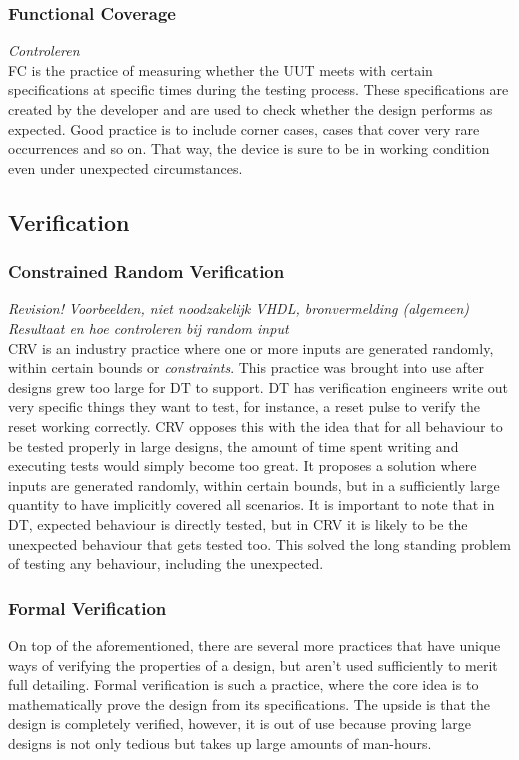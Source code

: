 \documentclass[11pt,british]{article}
\begin{document}
\subsubsection{Functional Coverage}
\emph{\color{red}Controleren}\\
\gls{FC} is the practice of measuring whether the \gls{UUT} meets with certain specifications at specific times during the testing process. These specifications are created by the developer and are used to check whether the design performs as expected. Good practice is to include corner cases, cases that cover very rare occurrences and so on. That way, the device is sure to be in working condition even under unexpected circumstances.

\subsection{Verification}
\subsubsection{Constrained Random Verification}
\emph{\color{red}Revision!}
\emph{\color{red}Voorbeelden, niet noodzakelijk VHDL, bronvermelding (algemeen)}\\
\emph{\color{red}Resultaat en hoe controleren bij random input}\\
\gls{CRV} is an industry practice where one or more inputs are generated randomly, within certain bounds or \emph{constraints}. This practice was brought into use after designs grew too large for \gls{DT} to support. DT has verification engineers write out very specific things they want to test, for instance, a reset pulse to verify the reset working correctly. CRV opposes this with the idea that for all behaviour to be tested properly in large designs, the amount of time spent writing and executing tests would simply become too great. It proposes a solution where inputs are generated randomly, within certain bounds, but in a sufficiently large quantity to have implicitly covered all scenarios. It is important to note that in DT, expected behaviour is directly tested, but in CRV it is likely to be the unexpected behaviour that gets tested too. This solved the long standing problem of testing any behaviour, including the unexpected.

\subsubsection{Formal Verification}
On top of the aforementioned, there are several more practices that have unique ways of verifying the properties of a design, but aren't used sufficiently to merit full detailing. Formal verification is such a practice, where the core idea is to mathematically prove the design from its specifications. The upside is that the design is completely verified, however, it is out of use because proving large designs is not only tedious but takes up large amounts of man-hours.
\end{document}
